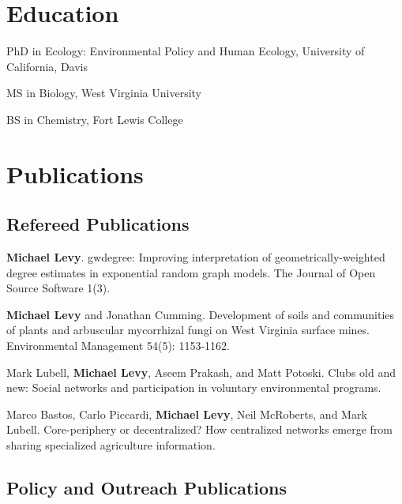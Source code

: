 \section{Education}\label{education}

\begin{description}
\tightlist
\item[2017 (anticipated)]
PhD in Ecology: Environmental Policy and Human Ecology, University of
California, Davis
\item[2012]
MS in Biology, West Virginia University
\item[2004]
BS in Chemistry, Fort Lewis College
\end{description}

\section{Publications}\label{publications}

\subsection{Refereed Publications}\label{refereed-publications}

\begin{description}
\tightlist
\item[2016]
\textbf{Michael Levy}. gwdegree: Improving interpretation of
geometrically-weighted degree estimates in exponential random graph
models. The Journal of Open Source Software 1(3).
\item[2014]
\textbf{Michael Levy} and Jonathan Cumming. Development of soils and
communities of plants and arbuscular mycorrhizal fungi on West Virginia
surface mines. Environmental Management 54(5): 1153-1162.
\item[In revision]
Mark Lubell, \textbf{Michael Levy}, Aseem Prakash, and Matt Potoski.
Clubs old and new: Social networks and participation in voluntary
environmental programs.
\item[In review]
Marco Bastos, Carlo Piccardi, \textbf{Michael Levy}, Neil McRoberts, and
Mark Lubell. Core-periphery or decentralized? How centralized networks
emerge from sharing specialized agriculture information.
\end{description}

\subsection{Policy and Outreach
Publications}\label{policy-and-outreach-publications}

